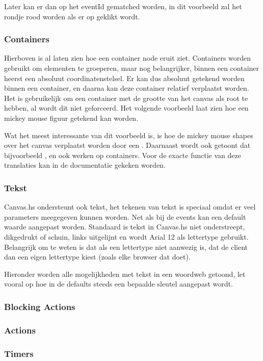 Later kan er dan op het eventId gematched worden, in dit voorbeeld zal het rondje rood worden als er op geklikt wordt.



\subsubsection{Containers}
Hierboven is al laten zien hoe een container node eruit ziet. Containers worden gebruikt om elementen te groeperen, maar nog belangrijker, binnen een container heerst een absoluut coordinatenstelsel. Er kan dus absoluut getekend worden binnen een container, en daarna kan deze container relatief verplaatst worden. Het is gebruikelijk om een container met de grootte van het canvas als root te hebben, al wordt dit niet geforceerd. Het volgende voorbeeld laat zien hoe een mickey mouse figuur getekend kan worden.



Wat het meest interessante van dit voorbeeld is, is hoe de mickey mouse shapes over het canvas verplaatst worden door een . Daarnaast wordt ook getoont dat bijvoorbeeld ,  en  ook werken op containers. Voor de exacte functie van deze translaties kan in de documentatie gekeken worden. 

\subsubsection{Tekst}

Canvas.hs ondersteunt ook tekst, het tekenen van tekst is speciaal omdat er veel parameters meegegeven kunnen worden. Net als bij de events kan een default waarde aangepast worden. Standaard is tekst in Canvas.hs niet onderstreept, dikgedrukt of schuin, links uitgelijnt en wordt Arial 12 als lettertype gebruikt. Belangrijk om te weten is dat als een lettertype niet aanwezig is, dat de client dan een eigen lettertype kiest (zoals elke browser dat doet).

Hieronder worden alle mogelijkheden met tekst in een woordweb getoond, let vooral op hoe in de defaults steeds een bepaalde sleutel aangepast wordt.


\subsubsection{Blocking Actions}

\subsubsection{Actions}

\subsubsection{Timers}
